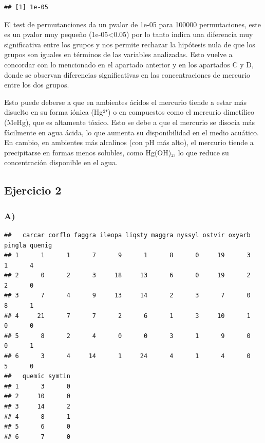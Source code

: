 \documentclass[
]{article}
\begin{document}
\begin{verbatim}
## [1] 1e-05
\end{verbatim}

El test de permutanciones da un pvalor de 1e-05 para 100000
permutaciones, este es un pvalor muy pequeño (1e-05\textless0.05) por lo
tanto indica una diferencia muy significativa entre los grupos y nos
permite rechazar la hipótesis nula de que los grupos son iguales en
términos de las variables analizadas. Esto vuelve a concordar con lo
mencionado en el apartado anterior y en los apartados C y D, donde se
observan diferencias significativas en las concentraciones de mercurio
entre los dos grupos.

Esto puede deberse a que en ambientes ácidos el mercurio tiende a estar
más disuelto en su forma iónica (Hg²⁺) o en compuestos como el mercurio
dimetílico (MeHg), que es altamente tóxico. Esto se debe a que el
mercurio se disocia más fácilmente en agua ácida, lo que aumenta su
disponibilidad en el medio acuático. En cambio, en ambientes más
alcalinos (con pH más alto), el mercurio tiende a precipitarse en formas
menos solubles, como Hg(OH)₂, lo que reduce su concentración disponible
en el agua.

\hypertarget{ejercicio-2}{%
\subsection{Ejercicio 2}\label{ejercicio-2}}

\hypertarget{a-1}{%
\subsubsection{A)}\label{a-1}}

\begin{verbatim}
##   carcar corflo faggra ileopa liqsty maggra nyssyl ostvir oxyarb pingla quenig
## 1      1      1      7      9      1      8      0     19      3      1      4
## 2      0      2      3     18     13      6      0     19      2      2      0
## 3      7      4      9     13     14      2      3      7      0      8      1
## 4     21      7      7      2      6      1      3     10      1      0      0
## 5      8      2      4      0      0      3      1      9      0      0      1
## 6      3      4     14      1     24      4      1      4      0      5      0
##   quemic symtin
## 1      3      0
## 2     10      0
## 3     14      2
## 4      8      1
## 5      6      0
## 6      7      0
\end{verbatim}
\end{document}
